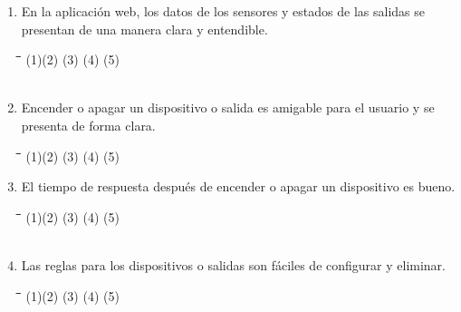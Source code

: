 \documentclass[]{proc}
\begin{document}
\begin{enumerate}
	\item En la aplicación web, los datos de los sensores y estados de las salidas se presentan de una manera clara y entendible.
	
	\begin{tabbing}
		\hspace{1cm}\=\hspace{1cm}\=\hspace{1cm}\=\hspace{1cm}\=\kill
		(1)\>(2)  \>(3)  \>(4)  \>(5) \\\\
	\end{tabbing} 
	
	\item Encender o apagar un dispositivo o salida es amigable para el usuario y se presenta de forma clara.
	
	\begin{tabbing}
		\hspace{1cm}\=\hspace{1cm}\=\hspace{1cm}\=\hspace{1cm}\=\kill
		(1)\>(2)  \>(3)  \>(4)  \>(5) \\
	\end{tabbing} 

	\item El tiempo de respuesta después de encender o apagar un dispositivo es bueno.
	
	\begin{tabbing}
		\hspace{1cm}\=\hspace{1cm}\=\hspace{1cm}\=\hspace{1cm}\=\kill
		(1)\>(2)  \>(3)  \>(4)  \>(5) \\\\
	\end{tabbing} 
	
	\item Las reglas para los dispositivos o salidas son fáciles de configurar y eliminar.
	
	\begin{tabbing}
		\hspace{1cm}\=\hspace{1cm}\=\hspace{1cm}\=\hspace{1cm}\=\kill
		(1)\>(2)  \>(3)  \>(4)  \>(5) \\\\
	\end{tabbing} 
	

\end{enumerate}
\end{document}

